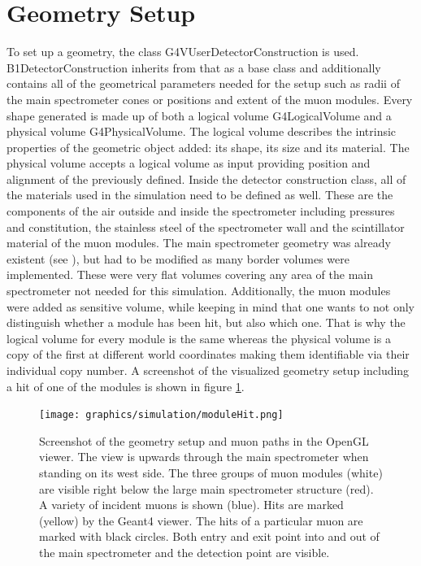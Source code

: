   \section{Geometry Setup}
  \label{ch:Simulation software:sec:Geometry setup}
  To set up a geometry, the class G4VUserDetectorConstruction is used. B1DetectorConstruction inherits from that as a base class and additionally contains all of the geometrical parameters needed for the setup such as radii of the main spectrometer cones or positions and extent of the muon modules. Every shape generated is made up of both a logical volume G4LogicalVolume and a physical volume G4PhysicalVolume. The logical volume describes the intrinsic properties of the geometric object added: its shape, its size and its material. The physical volume accepts a logical volume as input providing position and alignment of the previously defined.
  Inside the detector construction class, all of the materials used in the simulation need to be defined as well. These are the components of the air outside and inside the spectrometer including pressures and constitution, the stainless steel of the spectrometer wall and the scintillator material of the muon modules.
  The main spectrometer geometry was already existent (see \cite{mainSpecGeometry}), but had to be modified as many border volumes were implemented. These were very flat volumes covering any area of the main spectrometer not needed for this simulation. Additionally, the muon modules were added as sensitive volume, while keeping in mind that one wants to not only distinguish whether a module has been hit, but also which one. That is why the logical volume for every module is the same whereas the physical volume is a copy of the first at different world coordinates making them identifiable via their individual copy number. A screenshot of the visualized geometry setup including a hit of one of the modules is shown in figure \ref{fig:geant:geometry}.
  
  \begin{figure}
  	\centering
  	\texttt{[image: graphics/simulation/moduleHit.png]}
  	\caption[Simulation Geometry Setup]{Screenshot of the geometry setup and muon paths in the OpenGL viewer. The view is upwards through the main spectrometer when standing on its west side. The three groups of muon modules (white) are visible right below the large main spectrometer structure (red). A variety of incident muons is shown (blue). Hits are marked (yellow) by the Geant4 viewer. The hits of a particular muon are marked with black circles. Both entry and exit point into and out of the main spectrometer and the detection point are visible.}
  	\label{fig:geant:geometry}
  \end{figure}

